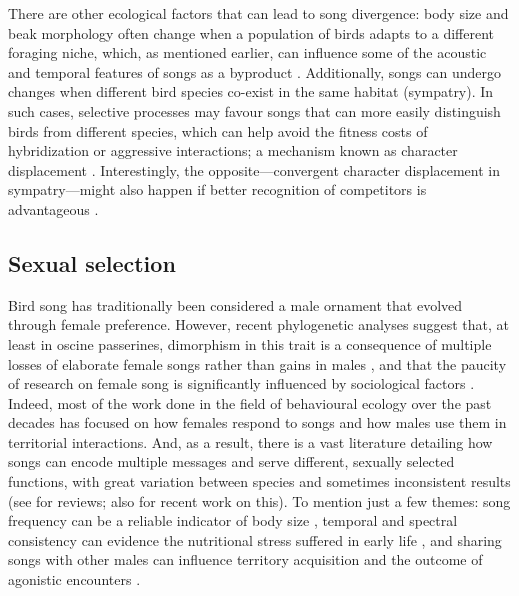 There are other ecological factors that can lead to song divergence: body size and beak morphology often change when a population of birds adapts to a different foraging niche, which, as mentioned earlier, can influence some of the acoustic and temporal features of songs as a byproduct \autocite{mayr1963,podos2001}. Additionally, songs can undergo changes when different bird species co-exist in the same habitat (sympatry). In such cases, selective processes may favour songs that can more easily distinguish birds from different species, which can help avoid the fitness costs of hybridization or aggressive interactions; a mechanism known as character displacement \autocite{seddon2005}. Interestingly, the opposite---convergent character displacement in sympatry---might also happen if better recognition of competitors is advantageous \autocite{grant1972, Tobias2014, Tobias2009}. 

\subsection{Sexual selection}
Bird song has traditionally been considered a male ornament that evolved through female preference. However, recent phylogenetic analyses suggest that, at least in oscine passerines, dimorphism in this trait is a consequence of multiple losses of elaborate female songs rather than gains in males \autocite{odom2014,odom2018}, and that the paucity of research on female song is significantly influenced by sociological factors \autocite{haines2020}. Indeed, most of the work done in the field of behavioural ecology over the past decades has focused on how females respond to songs and how males use them in territorial interactions. And, as a result, there is a vast literature detailing how songs can encode multiple messages and serve different, sexually selected functions, with great variation between species and sometimes inconsistent results (see \cite{catchpole2008} for reviews; also \cite{sierro2023} for recent work on this). To mention just a few themes: song frequency can be a reliable indicator of body size \autocite{ryan1985}, temporal and spectral consistency can evidence the nutritional stress suffered in early life \autocite{macdonald2006}, and sharing songs with other males can influence territory acquisition and the outcome of agonistic encounters \autocite{Demko2016a,krebs1978}.

